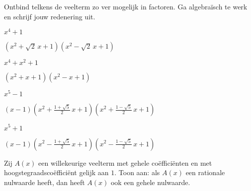 \documentclass{ximera}
\begin{document}
\begin{exercise}
Ontbind telkens de veelterm zo ver mogelijk in factoren. Ga algebraïsch te werk en schrijf jouw redenering uit.  

	\begin{question} $x^4+1$         \begin{uitkomst} \((x^2+\sqrt{2}\,x+1)(x^2-\sqrt{2}\,x+1)                                                    \) \end{uitkomst} \end{question}
	\begin{question} $x^4 + x^2 + 1$ \begin{uitkomst} \((x^2+x+1)(x^2-x+1)                                                                        \) \end{uitkomst} \end{question}
	\begin{question} $x^5-1$         \begin{uitkomst} \((x-1)\left(x^2+\frac{1+\sqrt{5}}{2}\,x+1\right)\left(x^2+\frac{1-\sqrt{5}}{2}\,x+1\right) \) \end{uitkomst} \end{question}
	\begin{question} $x^5+1$         \begin{uitkomst} \((x-1)\left(x^2-\frac{1+\sqrt{5}}{2}\,x+1\right)\left(x^2-\frac{1-\sqrt{5}}{2}\,x+1\right) \) \end{uitkomst} \end{question}
\end{exercise}

	

\begin{exercise}
Zij $A(x)$ een willekeurige veelterm met gehele coëfficiënten en met hoogstegraadscoëfficiënt gelijk aan $1$. Toon aan: als $A(x)$ een rationale nulwaarde heeft, dan heeft $A(x)$ ook een gehele nulwaarde.
\end{exercise}
\end{document}
